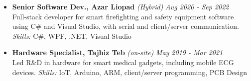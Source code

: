 \documentclass[a4paper]{article}
\begin{document}
\begin{paracol}{2}
\begin{itemize}[left=0pt]
    \item \textbf{Senior Software Dev., Azar Liopad}  \textit{\fontsize{8}{0}\selectfont (Hybrid)} \hfill \textit{Aug 2020 - Sep 2022} \\
    Full-stack developer for smart firefighting and safety equipment software using C\# and Visual Studio, with serial and client/server communication. \\ \textit{Skills:} C\#, WPF, .NET, Visual Studio

    \item \textbf{Hardware Specialist, Tajhiz Teb}  \textit{\fontsize{8}{0}\selectfont (on-site)} \hfill \textit{May 2019 - Mar 2021} \\
    Led R\&D in hardware for smart medical gadgets, including mobile ECG devices. \textit{Skills:} IoT, Arduino, ARM, client/server programming, PCB Design
\end{itemize}

\end{paracol} %


\newpage

\end{document}

